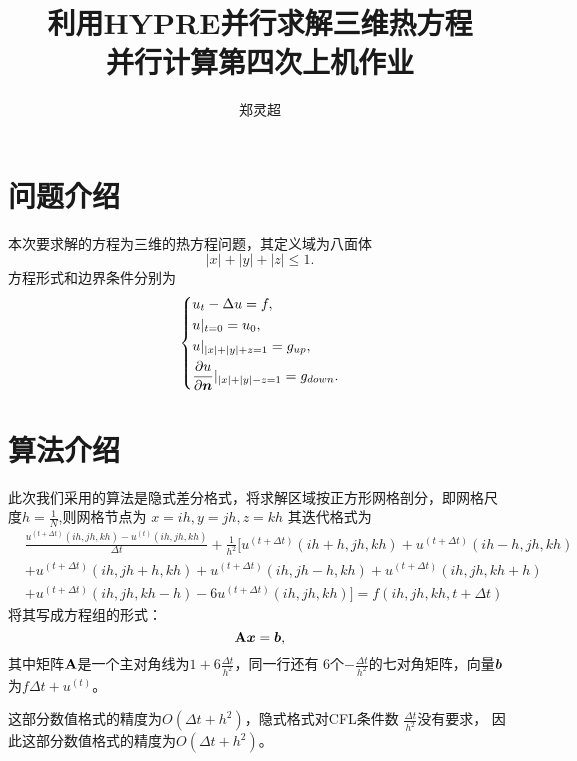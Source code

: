 \documentclass[a4paper,  11pt]{ctexart}
\newcommand\pd[2]{\dfrac{\partial {#1}}{\partial {#2}}}
\newcommand{\bm}[1]{\mbox{\boldmath{$#1$}}}
\begin{document}
\title{利用HYPRE并行求解三维热方程 \\ 并行计算第四次上机作业}
\author{郑灵超}
\maketitle
\tableofcontents
\newpage
\section{问题介绍}
本次要求解的方程为三维的热方程问题，其定义域为八面体
\[
 |x|+|y|+|z|\leq 1.
\]
方程形式和边界条件分别为
\begin{equation}
	\label{eq:Heatequation}
	\left\{
	\begin{aligned}
	&u_t-\Delta u = f,  \\
	&u|_{t=0} = u_0, \\
	&u|_{|x|+|y|+z=1} = g_{up}, \\
	&\pd{u}{\bm n}|_{|x|+|y|-z=1} = g_{down}. 
\end{aligned}
\right.
\end{equation}

\section{算法介绍}
此次我们采用的算法是隐式差分格式，将求解区域按正方形网格剖分，即网格尺
度$h=\frac 1 N$,则网格节点为
$x=ih,y=jh,z=kh$
其迭代格式为
\begin{equation}
	\begin{aligned}
		\label{eq:iteration}
		&\frac{u^{(t+\Delta t)}(ih,jh,kh) - u^{(t)}(ih,jh,kh)}{\Delta t} 
		+\frac{1}{h^2} [ u^{(t+\Delta t)}(ih+h,jh,kh) +u^{(t+\Delta
		t)}(ih-h,jh,kh) \\ 
 	&+u^{(t+\Delta t)}(ih,jh+h,kh) + u^{(t+\Delta t)}(ih,jh-h,kh)  
	+u^{(t+\Delta t)}(ih,jh,kh+h) \\ &+u^{(t+\Delta t)}(ih,jh,kh-h) - 6
	u^{(t+\Delta t)}(ih,jh,kh)] = f(ih,jh,kh,t+\Delta t)
\end{aligned}
\end{equation}
将其写成方程组的形式：
\begin{equation}
    {\bf A} \bm x = \bm b,
\end{equation}
其中矩阵${\bf A}$是一个主对角线为$1+6\frac{\Delta t}{h^2}$，同一行还有
6个$-\frac{\Delta t}{h^2}$的七对角矩阵，向量$\bm b$为$f\Delta
t+u^{(t)}$。

这部分数值格式的精度为$O(\Delta t+h^2)$，隐式格式对CFL条件数
$\frac{\Delta t}{h^2}$没有要求，
因此这部分数值格式的精度为$O(\Delta t+h^2)$。
\end{document}
